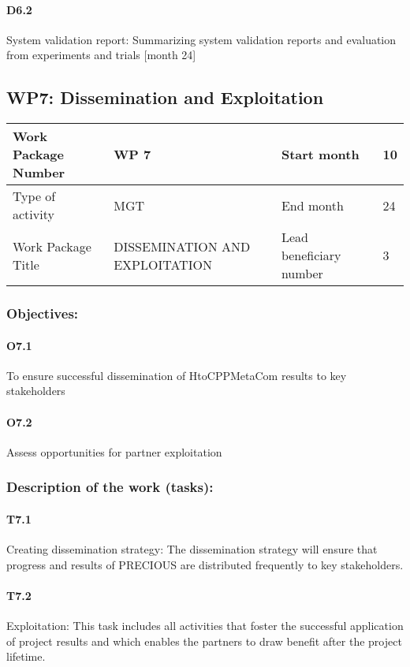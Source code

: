 \documentclass{article}
\begin{document}
\paragraph{D6.2} System validation report:  Summarizing system validation reports and evaluation from experiments and
trials [month 24]
\newpage

\subsection{WP7: Dissemination and Exploitation }

\begin{center}
	\begin{tabular}{ |p{3cm}|p{4cm}||p{2cm}|p{1cm}| }
		\hline
		Work Package Number & WP 7 & Start month & 10  \\ \hline
		Type of activity & MGT & End month & 24 \\ \hline
		Work Package Title & DISSEMINATION AND EXPLOITATION & Lead beneficiary number & 3 \\ \hline
	\end{tabular}
\end{center}

\subsubsection{Objectives:}
\paragraph{O7.1} To ensure successful dissemination of HtoCPPMetaCom results to key stakeholders 
\paragraph{O7.2} Assess opportunities for partner exploitation

\subsubsection{Description of the work (tasks):}
\paragraph{T7.1} Creating dissemination strategy: The dissemination strategy will ensure that progress and results of PRECIOUS are distributed frequently to key
stakeholders.
\paragraph{T7.2} Exploitation: This task includes all activities that foster the successful application of project results and which enables
the partners to draw benefit after the project lifetime.
\end{document}
